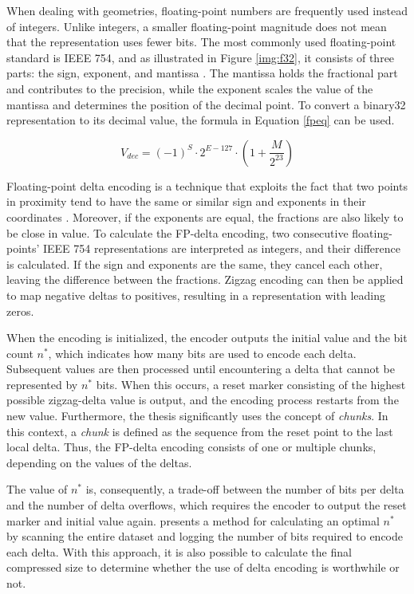 When dealing with geometries, floating-point numbers are frequently used instead of integers. Unlike integers, a smaller floating-point magnitude does not mean that the representation uses fewer bits. The most commonly used floating-point standard is IEEE 754, and as illustrated in Figure \ref{img:f32}, it consists of three parts: the sign, exponent, and mantissa \cite{fpbasics}. The mantissa holds the fractional part and contributes to the precision, while the exponent scales the value of the mantissa and determines the position of the decimal point. To convert a binary32 representation to its decimal value, the formula in Equation \ref{fpeq} can be used.

\begin{equation}
V_{dec} = (-1)^S \cdot 2^{E-127} \cdot (1 + \frac{M}{2^{23}})
\label{fpeq}
\end{equation}

Floating-point delta encoding is a technique that exploits the fact that two points in proximity tend to have the same or similar sign and exponents in their coordinates \cite{spatialparquet}. Moreover, if the exponents are equal, the fractions are also likely to be close in value. To calculate the FP-delta encoding, two consecutive floating-points' IEEE 754 representations are interpreted as integers, and their difference is calculated. If the sign and exponents are the same, they cancel each other, leaving the difference between the fractions. Zigzag encoding can then be applied to map negative deltas to positives, resulting in a representation with leading zeros.

When the encoding is initialized, the encoder outputs the initial value and the bit count \(n^*\), which indicates how many bits are used to encode each delta. Subsequent values are then processed until encountering a delta that cannot be represented by \(n^*\) bits. When this occurs, a reset marker consisting of the highest possible zigzag-delta value is output, and the encoding process restarts from the new value. Furthermore, the thesis significantly uses the concept of \textit{chunks}. In this context, a \textit{chunk} is defined as the sequence from the reset point to the last local delta. Thus, the FP-delta encoding consists of one or multiple chunks, depending on the values of the deltas. 

The value of \(n^*\) is, consequently, a trade-off between the number of bits per delta and the number of delta overflows, which requires the encoder to output the reset marker and initial value again. \citet{spatialparquet} presents a method for calculating an optimal \(n^*\) by scanning the entire dataset and logging the number of bits required to encode each delta. With this approach, it is also possible to calculate the final compressed size to determine whether the use of delta encoding is worthwhile or not.

